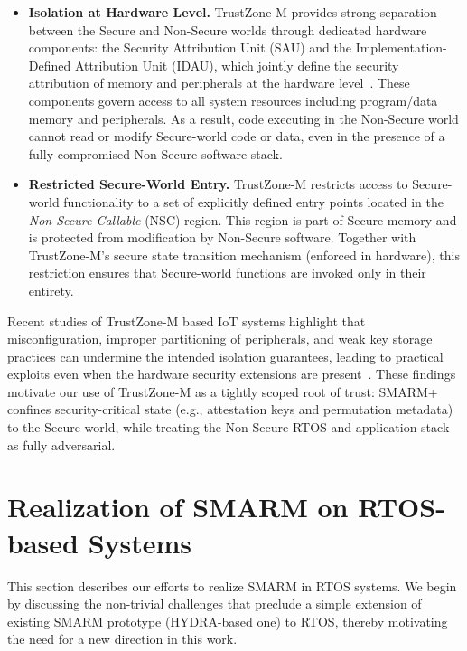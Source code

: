 \documentclass{ieeeaccess}
\newcommand{\rtsmarm}{SMARM+\xspace}
\begin{document}
\begin{itemize}
    \item \textbf{Isolation at Hardware Level.}
    TrustZone-M provides strong separation between the Secure and Non-Secure worlds through dedicated hardware components: the Security Attribution Unit (SAU) and the Implementation-Defined Attribution Unit (IDAU), which jointly define the security attribution of memory and peripherals at the hardware level~\cite{arm-trustzone-cm}.
    These components govern access to all system resources including program/data memory and peripherals.
    As a result, code executing in the Non-Secure world cannot read or modify Secure-world code or data, even in the presence of a fully compromised Non-Secure software stack.

    \item \textbf{Restricted Secure-World Entry.}
    TrustZone-M restricts access to Secure-world functionality to a set of explicitly defined entry points located in the \emph{Non-Secure Callable} (NSC) region.
    This region is part of Secure memory and is protected from modification by Non-Secure software.
    Together with TrustZone-M's secure state transition mechanism (enforced in hardware), this restriction ensures that Secure-world functions are invoked only in their entirety.
\end{itemize}


Recent studies of TrustZone-M based IoT systems highlight that misconfiguration,
improper partitioning of peripherals, and weak key storage practices can undermine the intended isolation guarantees, leading to practical exploits even when the hardware
security extensions are present~\cite{tzm-sec-iot,silabs-secure-key-storage}.
These findings motivate our use of TrustZone-M as a tightly scoped root of trust: \rtsmarm confines security-critical state (e.g., attestation keys and permutation
metadata) to the Secure world, while treating the Non-Secure RTOS and application stack as fully adversarial.

\section{Realization of SMARM on RTOS-based Systems}
\label{sec:porting}

This section describes our efforts to realize SMARM in RTOS systems.
We begin by discussing the non-trivial challenges that preclude a simple extension of existing SMARM prototype (HYDRA-based one) to RTOS, thereby motivating the need for a new direction in this work.
\end{document}
